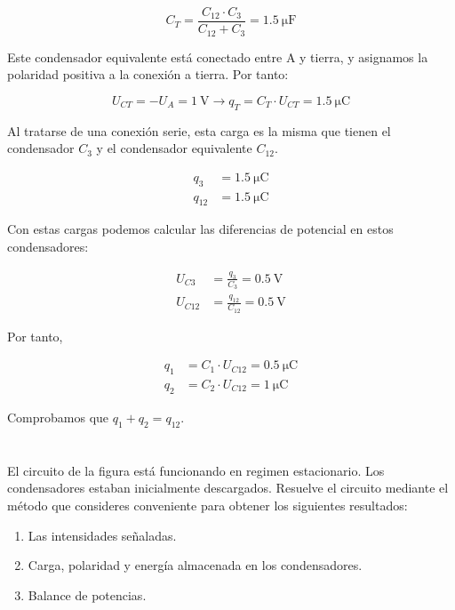 \documentclass[10pt]{article}
\begin{document}
\begin{equation*}
  C_T = \frac{C_{12} \cdot C_3}{C_{12} + C_3} = \SI{1.5}{\micro\farad}
\end{equation*}

Este condensador equivalente está conectado entre A y tierra, y asignamos la polaridad positiva a la conexión a tierra. Por tanto:

\begin{equation*}
  U_{CT} = -U_A = \SI{1}{\volt} \rightarrow q_T = C_T \cdot U_{CT} = \SI{1.5}{\micro\coulomb}
\end{equation*}

Al tratarse de una conexión serie, esta carga es la misma que tienen el condensador $C_3$ y el condensador equivalente $C_{12}$.

\begin{align*}
  q_3 &=  \SI{1.5}{\micro\coulomb}\\
  q_{12} &=  \SI{1.5}{\micro\coulomb}
\end{align*}

Con estas cargas podemos calcular las diferencias de potencial en estos condensadores:

\begin{align*}
  U_{C3} &=  \frac{q_3}{C_3} = \SI{0.5}{\volt}\\
  U_{C12} &=  \frac{q_{12}}{C_{12}} = \SI{0.5}{\volt}
\end{align*}

Por tanto,

\begin{align*}
  q_1 &= C_1 \cdot U_{C12} = \SI{0.5}{\micro\coulomb}\\
  q_2 &= C_2 \cdot U_{C12} = \SI{1}{\micro\coulomb}
\end{align*}

Comprobamos que $q_1 + q_2 = q_{12}$.

\clearpage


\section{}

El circuito de la figura está funcionando en regimen estacionario. Los condensadores estaban inicialmente descargados. Resuelve el circuito mediante el método que consideres conveniente para obtener los siguientes resultados:

\begin{enumerate}
\item Las intensidades señaladas.
\item Carga, polaridad y energía almacenada en los condensadores.
\item Balance de potencias.
\end{enumerate}
\end{document}
